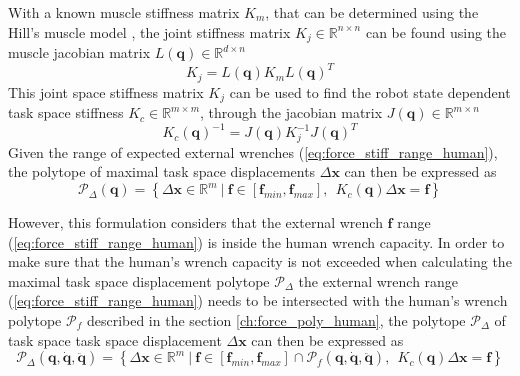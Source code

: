 With a known muscle stiffness matrix $K_m$, that can be determined using the Hill's muscle model \cite{LATASH1993653}, the joint stiffness matrix $K_j\in \mathbb{R}^{n\times n}$ can be found using the muscle jacobian matrix $L(\bm{q}) \in \mathbb{R}^{d\times n}$
\begin{equation}
    K_j = L(\bm{q}) K_m L(\bm{q})^T 
\end{equation}
This joint space stiffness matrix $K_j$ can be used to find the robot state dependent task space stiffness $K_c  \in \mathbb{R}^{m\times m}$, through the jacobian matrix $J(\bm{q})\in\mathbb{R}^{m\times n}$  \cite{Salisbury1980,Ajoudani2018,Inouye2016}
\begin{equation}
     K_c(\bm{q})^{-1} = J(\bm{q}) K_j^{-1}J(\bm{q})^T
\end{equation}
Given the range of expected external wrenches (\ref{eq:force_stiff_range_human}), the polytope of maximal task space displacements $\Delta\bm{x}$ can then be expressed as
\begin{equation}
    \mathcal{P}_\Delta(\bm{q}) = \left\{ \Delta\bm{x} \in \mathbb{R}^m ~|~ \bm{f}\in\left[\bm{f}_{min}, \bm{f}_{max} \right], ~~ K_c(\bm{q})\Delta\bm{x} = \bm{f} \right\}
    \label{eq:stiffness_human_simple}
\end{equation}


However, this formulation considers that the external wrench $\bm{f}$ range (\ref{eq:force_stiff_range_human}) is inside the human wrench capacity. In order to make sure that the human's wrench capacity is not exceeded when calculating the maximal task space displacement polytope $\mathcal{P}_\Delta$ the external wrench range (\ref{eq:force_stiff_range_human}) needs to be intersected with the human's wrench polytope  $\mathcal{P}_f$ described in the section \ref{ch:force_poly_human}, the polytope $\mathcal{P}_\Delta$ of task space task space displacement $\Delta \bm{x}$ can then be expressed as
\begin{equation}
    \mathcal{P}_\Delta(\bm{q},\dot{\bm{q}},\ddot{\bm{q}}) = \left\{ \Delta\bm{x} \in \mathbb{R}^m ~|~ \bm{f}\in \left[\bm{f}_{min}, \bm{f}_{max} \right] \cap \mathcal{P}_f(\bm{q},\dot{\bm{q}},\ddot{\bm{q}}),  ~~ \! K_c(\bm{q})\Delta\bm{x}=\bm{f}\right\}
\end{equation}

